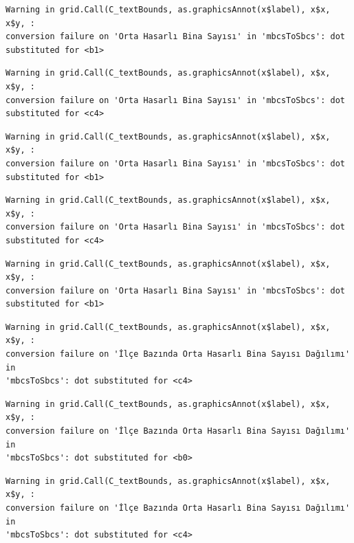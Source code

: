 \documentclass[
  11pt,
  a4paper,
  DIV=11,
  numbers=noendperiod]{scrartcl}
\begin{document}
\begin{verbatim}
Warning in grid.Call(C_textBounds, as.graphicsAnnot(x$label), x$x, x$y, :
conversion failure on 'Orta Hasarlı Bina Sayısı' in 'mbcsToSbcs': dot
substituted for <b1>
\end{verbatim}

\begin{verbatim}
Warning in grid.Call(C_textBounds, as.graphicsAnnot(x$label), x$x, x$y, :
conversion failure on 'Orta Hasarlı Bina Sayısı' in 'mbcsToSbcs': dot
substituted for <c4>
\end{verbatim}

\begin{verbatim}
Warning in grid.Call(C_textBounds, as.graphicsAnnot(x$label), x$x, x$y, :
conversion failure on 'Orta Hasarlı Bina Sayısı' in 'mbcsToSbcs': dot
substituted for <b1>
\end{verbatim}

\begin{verbatim}
Warning in grid.Call(C_textBounds, as.graphicsAnnot(x$label), x$x, x$y, :
conversion failure on 'Orta Hasarlı Bina Sayısı' in 'mbcsToSbcs': dot
substituted for <c4>
\end{verbatim}

\begin{verbatim}
Warning in grid.Call(C_textBounds, as.graphicsAnnot(x$label), x$x, x$y, :
conversion failure on 'Orta Hasarlı Bina Sayısı' in 'mbcsToSbcs': dot
substituted for <b1>
\end{verbatim}

\begin{verbatim}
Warning in grid.Call(C_textBounds, as.graphicsAnnot(x$label), x$x, x$y, :
conversion failure on 'İlçe Bazında Orta Hasarlı Bina Sayısı Dağılımı' in
'mbcsToSbcs': dot substituted for <c4>
\end{verbatim}

\begin{verbatim}
Warning in grid.Call(C_textBounds, as.graphicsAnnot(x$label), x$x, x$y, :
conversion failure on 'İlçe Bazında Orta Hasarlı Bina Sayısı Dağılımı' in
'mbcsToSbcs': dot substituted for <b0>
\end{verbatim}

\begin{verbatim}
Warning in grid.Call(C_textBounds, as.graphicsAnnot(x$label), x$x, x$y, :
conversion failure on 'İlçe Bazında Orta Hasarlı Bina Sayısı Dağılımı' in
'mbcsToSbcs': dot substituted for <c4>
\end{verbatim}
\end{document}

